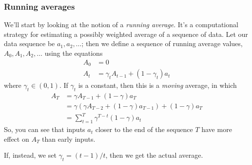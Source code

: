 \subsubsection{Running averages}
We'll start by looking at the notion of a {\em running average}.  It's
a computational strategy for estimating a possibly weighted average of
a sequence  of data.  Let our data sequence be $a_1, a_2, \ldots$;
then we define a sequence of running average values, $A_0, A_1, A_2,
\ldots$ using the equations
\begin{align*}
A_0 &= 0 \\
A_t &=  \gamma_t A_{t-1} +  (1 - \gamma_t) a_t
\end{align*}
where $\gamma_t \in (0, 1)$.  If $\gamma_t$ is a constant, then this
is a {\em  moving} average, in which 
\begin{align*}
A_T & = \gamma A_{T-1} + (1  - \gamma) a_T \\
& = \gamma (\gamma A_{T-2} + (1  - \gamma) a_{T-1}) + (1  - \gamma) a_T \\
& = \sum_{t = 1}^T \gamma^{T-t}(1 - \gamma) a_t
\end{align*}
So, you can see that inputs $a_t$ closer to the end of the sequence $T$
have  more effect on $A_T$ than early inputs.

If, instead, we set $\gamma_t = (t - 1)  / t$, then we get the actual
average.

